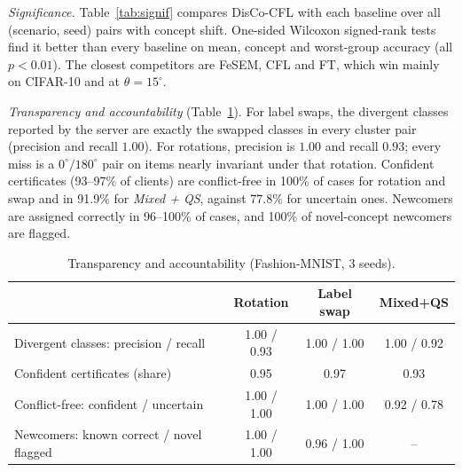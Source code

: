 \documentclass[journal]{IEEEtran}
\theoremstyle{definition}
\begin{document}
\begin{table}[t]
\centering
\caption{Robustness sweeps (Fashion-MNIST): DisCo-CFL vs.\ best baseline and Oracle accuracy.}\label{tab:sweep}
\scriptsize\setlength{\tabcolsep}{2.5pt}

\end{table}

\emph{Significance.} Table~\ref{tab:signif} compares DisCo-CFL with each baseline over all (scenario, seed) pairs with concept shift. One-sided Wilcoxon signed-rank tests find it better than every baseline on mean, concept and worst-group accuracy (all $p<0.01$). The closest competitors are FeSEM, CFL and FT, which win mainly on CIFAR-10 and at $\theta=15^\circ$.

\begin{table}[t]
\centering
\caption{Paired one-sided Wilcoxon signed-rank tests, DisCo-CFL vs.\ each baseline, over (scenario, seed) pairs with concept shift. W/T/L: wins/ties/losses of DisCo-CFL.}\label{tab:signif}
\scriptsize\setlength{\tabcolsep}{2.2pt}

\end{table}

\emph{Transparency and accountability} (Table~\ref{tab:fat}). For label swaps, the divergent classes reported by the server are exactly the swapped classes in every cluster pair (precision and recall $1.00$). For rotations, precision is $1.00$ and recall $0.93$; every miss is a $0^\circ/180^\circ$ pair on items nearly invariant under that rotation. Confident certificates (93--97\% of clients) are conflict-free in 100\% of cases for rotation and swap and in 91.9\% for \emph{Mixed + QS}, against 77.8\% for uncertain ones. Newcomers are assigned correctly in 96--100\% of cases, and 100\% of novel-concept newcomers are flagged.

\begin{table}[t]
\centering
\caption{Transparency and accountability (Fashion-MNIST, 3 seeds).}\label{tab:fat}
\scriptsize\setlength{\tabcolsep}{3pt}
\begin{tabular}{lccc}
\toprule
& Rotation & Label swap & Mixed+QS \\
\midrule
Divergent classes: precision / recall & 1.00 / 0.93 & 1.00 / 1.00 & 1.00 / 0.92 \\
Confident certificates (share) & 0.95 & 0.97 & 0.93 \\
Conflict-free: confident / uncertain & 1.00 / 1.00 & 1.00 / 1.00 & 0.92 / 0.78 \\
Newcomers: known correct / novel flagged & 1.00 / 1.00 & 0.96 / 1.00 & -- \\
\bottomrule
\end{tabular}
\end{table}
\end{document}
